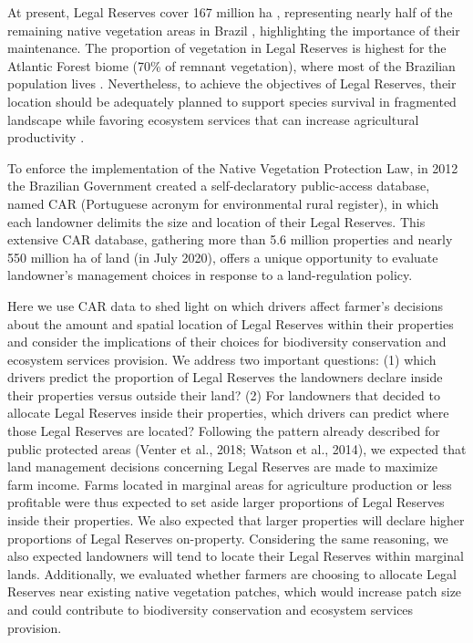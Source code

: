 \documentclass[
	12pt,				%
	oneside,			%
	a4paper,			%
	chapter=TITLE,		%
	section=TITLE,		%
	brazil,			%
	english				%
	]{abntex2}
\begin{document}
At present, Legal Reserves cover 167 million ha \autocite{metzger_why_2019}, representing nearly half of the remaining native vegetation areas in Brazil \autocite{soares-filho_cracking_2014}, highlighting the importance of their maintenance. The proportion of vegetation in Legal Reserves is highest for the Atlantic Forest biome (70\% of remnant vegetation), where most of the Brazilian population lives \autocite{rezende_hotspot_2018}. Nevertheless, to achieve the objectives of Legal Reserves, their location should be adequately planned to support species survival in fragmented landscape \autocite{fahrig_ecological_2017,tambosi_framework_2014} while favoring ecosystem services that can increase agricultural productivity \autocite{boesing_effects_2017,garibaldi_stability_2011}.

To enforce the implementation of the Native Vegetation Protection Law, in 2012 the Brazilian Government created a self-declaratory public-access database, named CAR (Portuguese acronym for environmental rural register), in which each landowner delimits the size and location of their Legal Reserves. This extensive CAR database, gathering more than 5.6 million properties and nearly 550 million ha of land (in July 2020), offers a unique opportunity to evaluate landowner's management choices in response to a land-regulation policy.

Here we use CAR data to shed light on which drivers affect farmer's decisions about the amount and spatial location of Legal Reserves within their properties and consider the implications of their choices for biodiversity conservation and ecosystem services provision. We address two important questions: (1) which drivers predict the proportion of Legal Reserves the landowners declare inside their properties versus outside their land? (2) For landowners that decided to allocate Legal Reserves inside their properties, which drivers can predict where those Legal Reserves are located?
Following the pattern already described for public protected areas (Venter et al., 2018; Watson et al., 2014), we expected that land management decisions concerning Legal Reserves are made to maximize farm income. Farms located in marginal areas for agriculture production or less profitable were thus expected to set aside larger proportions of Legal Reserves inside their properties. We also expected that larger properties will declare higher proportions of Legal Reserves on-property. Considering the same reasoning, we also expected landowners will tend to locate their Legal Reserves within marginal lands. Additionally, we evaluated whether farmers are choosing to allocate Legal Reserves near existing native vegetation patches, which would increase patch size and could contribute to biodiversity conservation and ecosystem services provision.
\end{document}
